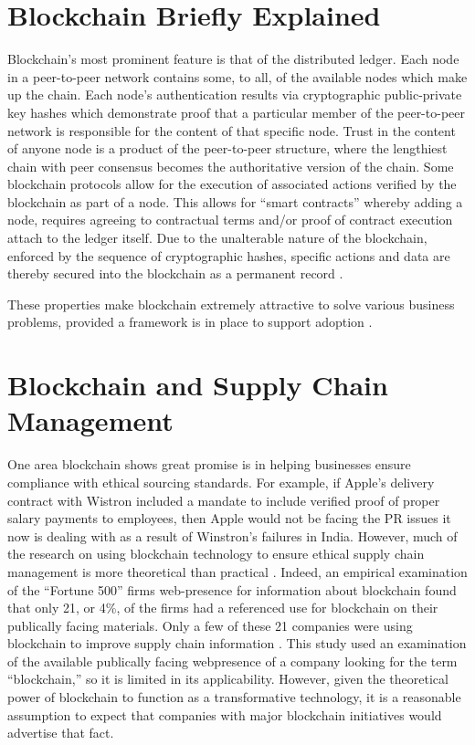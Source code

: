 \documentclass[man]{apa7}
\begin{document}
\section{Blockchain Briefly Explained}
\label{sec:orgfafa325}

Blockchain's most prominent feature is that of the distributed ledger. Each node
in a peer-to-peer network contains some, to all, of the available nodes which
make up the chain. Each node's authentication results via cryptographic
public-private key hashes which demonstrate proof that a particular member of
the peer-to-peer network is responsible for the content of that specific node.
Trust in the content of anyone node is a product of the peer-to-peer structure,
where the lengthiest chain with peer consensus becomes the authoritative version
of the chain. Some blockchain protocols allow for the execution of associated
actions verified by the blockchain as part of a node. This allows
for ``smart contracts'' whereby adding a node, requires agreeing to contractual
terms and/or proof of contract execution attach to the ledger itself. Due to the
unalterable nature of the blockchain, enforced by the sequence of cryptographic
hashes, specific actions and data are thereby secured into the blockchain as a
permanent record \cite{mearianWhatBlockchainComplete2019}.

These properties make blockchain extremely attractive to solve various business
problems, provided a framework is in place to support adoption
\parencite{iansitiTruthBlockchain2017}.

\section{Blockchain and Supply Chain Management}
\label{sec:org527033c}

One area blockchain shows great promise is in helping businesses ensure
compliance with ethical sourcing standards. For example, if Apple's delivery
contract with Wistron included a mandate to include verified proof of proper
salary payments to employees, then Apple would not be facing the PR issues it
now is dealing with as a result of Winstron's failures in India. However, much
of the research on using blockchain technology to ensure ethical supply chain
management is more theoretical than practical
\parencite{venkateshSystemArchitectureBlockchain2020}. Indeed, an empirical
examination of the ``Fortune 500'' firms web-presence for information about
blockchain found that only 21, or 4\%, of the firms had a referenced use for
blockchain on their publically facing materials. Only a few of these 21
companies were using blockchain to improve supply chain information
\parencite{caseBlockchainEmpiricalReview2020}. This study used an examination of
the available publically facing webpresence of a company looking for the term
``blockchain,'' so it is limited in its applicability. However, given the theoretical
power of blockchain to function as a  transformative technology, it is a
reasonable assumption to expect that companies with major blockchain initiatives
would advertise that fact. 
\end{document}
